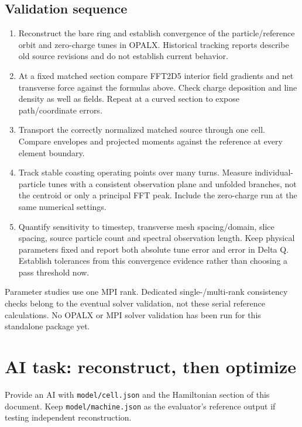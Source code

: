 \documentclass[
  11pt,
  a4paper,
]{article}
\providecommand{\tightlist}{%
  \setlength{\itemsep}{0pt}\setlength{\parskip}{0pt}}
\begin{document}
\subsection{Validation sequence}\label{validation-sequence}

\begin{enumerate}
\def\labelenumi{\arabic{enumi}.}
\tightlist
\item
  Reconstruct the bare ring and establish convergence of the
  particle/reference orbit and zero-charge tunes in OPALX. Historical
  tracking reports describe old source revisions and do not establish
  current behavior.
\item
  At a fixed matched section compare FFT2D5 interior field gradients and
  net transverse force against the formulas above. Check charge
  deposition and line density as well as fields. Repeat at a curved
  section to expose path/coordinate errors.
\item
  Transport the correctly normalized matched source through one cell.
  Compare envelopes and projected moments against the reference at every
  element boundary.
\item
  Track stable coasting operating points over many turns. Measure
  individual-particle tunes with a consistent observation plane and
  unfolded branches, not the centroid or only a principal FFT peak.
  Include the zero-charge run at the same numerical settings.
\item
  Quantify sensitivity to timestep, transverse mesh spacing/domain,
  slice spacing, source particle count and spectral observation length.
  Keep physical parameters fixed and report both absolute tune error and
  error in Delta Q. Establish tolerances from this convergence evidence
  rather than choosing a pass threshold now.
\end{enumerate}

Parameter studies use one MPI rank. Dedicated single-/multi-rank
consistency checks belong to the eventual solver validation, not these
serial reference calculations. No OPALX or MPI solver validation has
been run for this standalone package yet.

\section{AI task: reconstruct, then
optimize}\label{ai-task-reconstruct-then-optimize}

Provide an AI with \texttt{model/cell.json} and the Hamiltonian section
of this document. Keep \texttt{model/machine.json} as the evaluator's
reference output if testing independent reconstruction.
\end{document}
